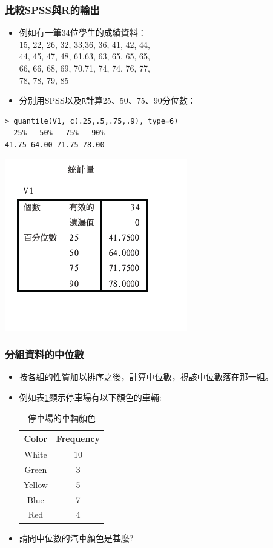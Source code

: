 \documentclass{beamer}
\begin{document}
\begin{frame}[fragile=singleslide]\frametitle{比較SPSS與R的輸出}
\begin{itemize}
\item 例如有一筆34位學生的成績資料：\\
15, 22, 26, 32, 33,36, 36, 41, 42, 44,\\
44, 45, 47, 48, 61,63, 63, 65, 65, 65,\\
66, 66, 68, 69, 70,71, 74, 74, 76, 77,\\
78, 78, 79, 85
\item 分別用SPSS以及\texttt{R}計算25、50、75、90分位數：
\end{itemize}
\begin{verbatim}
> quantile(V1, c(.25,.5,.75,.9), type=6)
  25%   50%   75%   90% 
41.75 64.00 71.75 78.00 
\end{verbatim}
\begin{center}
\includegraphics[scale=.65]{v1_quantile.png}
\end{center}
\end{frame}
\begin{frame}\frametitle{分組資料的中位數}
\begin{itemize}
\item 按各組的性質加以排序之後，計算中位數，視該中位數落在那一組。
\item  例如表\ref{tab:cars}顯示停車場有以下顏色的車輛:
\begin{table}
\caption{停車場的車輛顏色}
\label{tab:cars}
\begin{tabular}{| c |  c |}
\hline
Color & Frequency \\
\hline
White & 10 \\
Green & 3 \\
Yellow & 5 \\
Blue & 7 \\
Red & 4 \\
\hline
\end{tabular}
\end{table}
\item 請問中位數的汽車顏色是甚麼? 
\end{itemize}
\end{frame}
\end{document}
